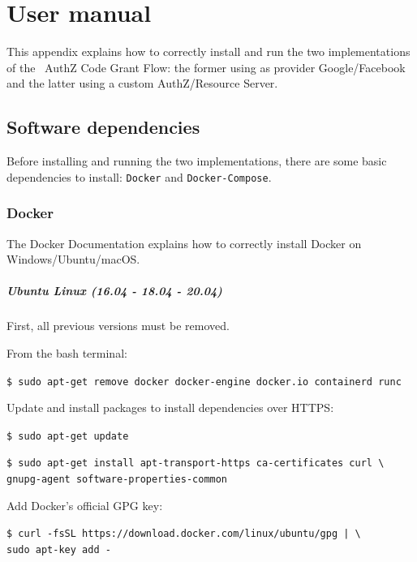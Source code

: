 
\appendix
\chapter{User manual}
This appendix explains how to correctly install and run the two implementations of the \oauth\ AuthZ Code Grant Flow: the former using as provider Google/Facebook and the latter using a custom AuthZ/Resource Server.

\section{Software dependencies}
\label{appa}
Before installing and running the two implementations, there are some basic dependencies to install: \texttt{Docker} and \texttt{Docker-Compose}.

\subsection{Docker}
\label{ublin}
The Docker Documentation \cite{docker} explains how to correctly install Docker on Windows/Ubuntu/macOS.

\paragraph{Ubuntu Linux (16.04 - 18.04 - 20.04)} First, all previous versions must be removed. 

\noindent From the bash terminal:
  
\texttt{\$ sudo apt-get remove docker docker-engine docker.io containerd runc}

\noindent Update and install packages to install dependencies over HTTPS:

\texttt{\$ sudo apt-get update}

\texttt{\$ sudo apt-get install apt-transport-https ca-certificates curl \textbackslash} \\
\indent \hspace{0.8cm} \texttt{gnupg-agent software-properties-common}

\noindent Add Docker’s official GPG key:

  \texttt{\$ curl -fsSL https://download.docker.com/linux/ubuntu/gpg | \textbackslash} \\
  \indent \hspace{0.8cm} \texttt{sudo apt-key add -}

